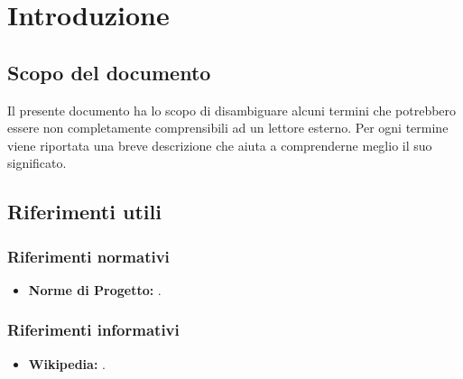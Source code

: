 \section{Introduzione}

	\subsection{Scopo del documento}
		
	Il presente documento ha lo scopo di disambiguare alcuni termini che potrebbero essere non completamente comprensibili ad un lettore esterno. Per ogni termine viene riportata una breve descrizione che aiuta a comprenderne meglio il suo significato.
	

	\subsection{Riferimenti utili}
		
		\subsubsection{Riferimenti normativi}
		\begin{itemize}
			\item \textbf{Norme di Progetto:} .
		\end{itemize}
		
		\subsubsection{Riferimenti informativi}
		\begin{itemize}
			\item \textbf{Wikipedia:} .
		\end{itemize}
